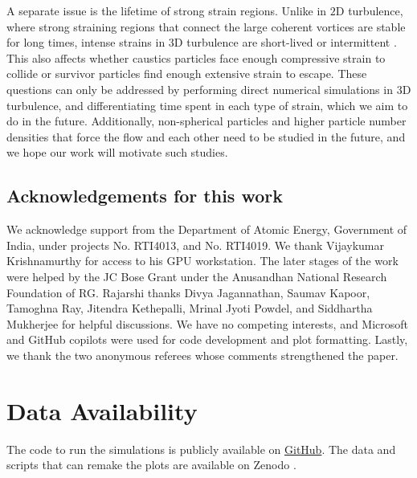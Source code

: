 \documentclass[../Rajarshi-thesis-draft.tex]{subfiles}
\begin{document}
{A separate issue is the lifetime of strong strain regions. Unlike in $2$D turbulence, where strong straining regions that connect the large coherent vortices are stable for long times, intense strains in $3$D turbulence are short-lived or intermittent \cite{buaria2022}. This also affects whether caustics particles face enough compressive strain to collide or survivor particles find enough extensive strain to escape. These questions can only be addressed by performing direct numerical simulations in $3$D turbulence, and differentiating time spent in each type of strain, which we aim to do in the future.} Additionally, non-spherical particles and higher particle number densities that force the flow and each other need to be studied in the future, and we hope our work will motivate such studies.

\subsection*{Acknowledgements for this work}
We acknowledge support from the Department of Atomic Energy, Government of India, under projects No. RTI4013, and No. RTI4019. We thank Vijaykumar Krishnamurthy for access to his GPU workstation. The later stages of the work were helped by the JC Bose Grant under the Anusandhan National Research Foundation of RG. Rajarshi thanks Divya Jagannathan, Saumav Kapoor, Tamoghna Ray, Jitendra Kethepalli, Mrinal Jyoti Powdel, and Siddhartha Mukherjee for helpful discussions. We have no competing interests, and Microsoft and GitHub copilots were used for code development and plot formatting. Lastly, we thank the two anonymous referees whose comments strengthened the paper.
\section*{Data Availability}
The code to run the simulations is publicly available on \href{https://github.com/Rajarshi-prime/2D_Caustics}{GitHub}. The data and scripts that can remake the plots are available on Zenodo \cite{chattopadhyay2026v2}.
\end{document}
